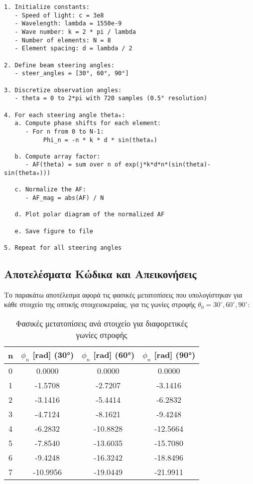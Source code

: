 \documentclass[a4paper,12pt]{report}
\newcommand{\en}{\selectlanguage{english}}
\newcommand{\gr}{\selectlanguage{greek}}
\begin{document}
\begin{tcolorbox}[colback=gray!5!white, colframe=black!75!black, title=Ψευδοκώδικας \en \texttt{OpticalBeamSteering}\gr]
\en
\begin{verbatim}
1. Initialize constants:
   - Speed of light: c = 3e8
   - Wavelength: lambda = 1550e-9
   - Wave number: k = 2 * pi / lambda
   - Number of elements: N = 8
   - Element spacing: d = lambda / 2

2. Define beam steering angles:
   - steer_angles = [30°, 60°, 90°]

3. Discretize observation angles:
   - theta = 0 to 2*pi with 720 samples (0.5° resolution)

4. For each steering angle theta₀:
   a. Compute phase shifts for each element:
      - For n from 0 to N-1:
           Phi_n = -n * k * d * sin(theta₀)

   b. Compute array factor:
      - AF(theta) = sum over n of exp(j*k*d*n*(sin(theta)-sin(theta₀)))

   c. Normalize the AF:
      - AF_mag = abs(AF) / N

   d. Plot polar diagram of the normalized AF

   e. Save figure to file

5. Repeat for all steering angles
\end{verbatim}
\end{tcolorbox}

\vspace{0.2cm}

\subsection{Αποτελέσματα Kώδικα και Aπεικονήσεις}

Το παρακάτω αποτέλεσμα αφορά τις φασικές μετατοπίσεις που υπολογίστηκαν για κάθε στοιχείο της οπτικής στοιχειοκεραίας, για τις γωνίες στροφής \( \theta_0 = 30^\circ, 60^\circ, 90^\circ \):

\begin{table}[H]
\centering
\caption{Φασικές μετατοπίσεις ανά στοιχείο για διαφορετικές γωνίες στροφής}
\en
\begin{tabular}{|c|c|c|c|}
\hline
\textbf{n} & \(\phi_n \) [rad] (30°) & \(\phi_n \) [rad] (60°) & \(\phi_n \) [rad] (90°) \\
\hline
0 & 0.0000 & 0.0000 & 0.0000 \\
1 & -1.5708 & -2.7207 & -3.1416 \\
2 & -3.1416 & -5.4414 & -6.2832 \\
3 & -4.7124 & -8.1621 & -9.4248 \\
4 & -6.2832 & -10.8828 & -12.5664 \\
5 & -7.8540 & -13.6035 & -15.7080 \\
6 & -9.4248 & -16.3242 & -18.8496 \\
7 & -10.9956 & -19.0449 & -21.9911 \\
\hline
\end{tabular}
\gr
\end{table}
\end{document}
